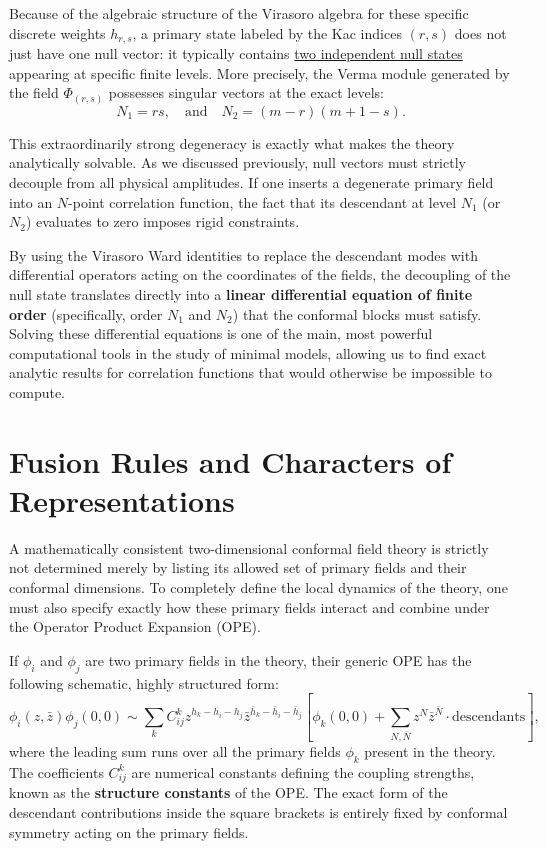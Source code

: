 Because of the algebraic structure of the Virasoro algebra for these specific discrete weights \(h_{r,s}\), a primary state labeled by the Kac indices \((r, s)\) does not just have one null vector: it typically contains \uline{two independent null states} appearing at specific finite levels. More precisely, the Verma module generated by the field \(\Phi_{(r,s)}\) possesses singular vectors at the exact levels:
\[
    N_1 = rs, \quad \text{and} \quad N_2 = (m - r)(m + 1 - s).
\]

This extraordinarily strong degeneracy is exactly what makes the theory analytically solvable. As we discussed previously, null vectors must strictly decouple from all physical amplitudes. If one inserts a degenerate primary field into an \(N\)-point correlation function, the fact that its descendant at level \(N_1\) (or \(N_2\)) evaluates to zero imposes rigid constraints.

By using the Virasoro Ward identities to replace the descendant modes with differential operators acting on the coordinates of the fields, the decoupling of the null state translates directly into a \textbf{linear differential equation of finite order} (specifically, order \(N_1\) and \(N_2\)) that the conformal blocks must satisfy. Solving these differential equations is one of the main, most powerful computational tools in the study of minimal models, allowing us to find exact analytic results for correlation functions that would otherwise be impossible to compute.

\section{Fusion Rules and Characters of Representations}

A mathematically consistent two-dimensional conformal field theory is strictly not determined merely by listing its allowed set of primary fields and their conformal dimensions. To completely define the local dynamics of the theory, one must also specify exactly how these primary fields interact and combine under the Operator Product Expansion (OPE).

If \(\phi_i\) and \(\phi_j\) are two primary fields in the theory, their generic OPE has the following schematic, highly structured form:
\[
    \phi_i(z, \bar{z}) \phi_j(0, 0) \sim \sum_k C_{ij}^k z^{h_k - h_i - h_j} \bar{z}^{\bar{h}_k - \bar{h}_i - \bar{h}_j} \left[ \phi_k(0, 0) + \sum_{N, \bar{N}} z^N \bar{z}^{\bar{N}} \cdot \text{descendants} \right],
\]
where the leading sum runs over all the primary fields \(\phi_k\) present in the theory. The coefficients \(C_{ij}^k\) are numerical constants defining the coupling strengths, known as the \textbf{structure constants} of the OPE. The exact form of the descendant contributions inside the square brackets is entirely fixed by conformal symmetry acting on the primary fields.

